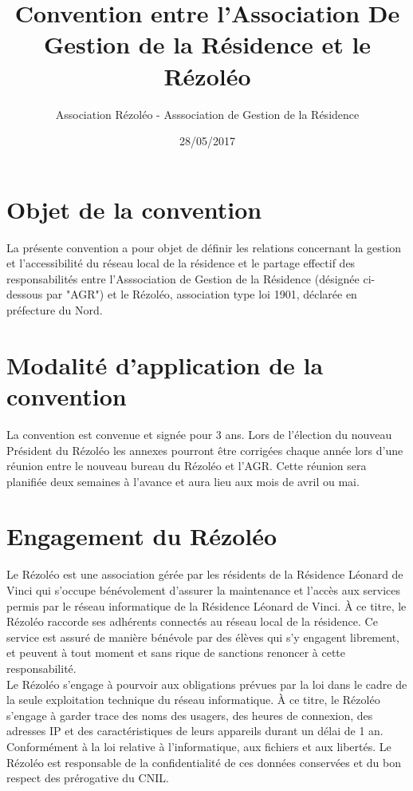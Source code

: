 \documentclass[12pt]{constitution}
\begin{document}
\title{Convention entre l'Association De Gestion de la Résidence et le Rézoléo}
\author{Association Rézoléo - Asssociation de Gestion de la Résidence}
\date{28/05/2017}
\maketitle

\section{Objet de la convention}

    La présente convention a pour objet de définir les relations concernant la gestion et l'accessibilité du réseau local de la résidence et le partage effectif des responsabilités entre l'Asssociation de Gestion de la Résidence (désignée ci-dessous par "AGR") et le Rézoléo, association type loi 1901, déclarée en préfecture du Nord.


\section{Modalité d'application de la convention}

    La convention est convenue et signée pour 3 ans. Lors de l'élection du nouveau Président du Rézoléo les annexes pourront être corrigées chaque année lors d'une réunion entre le nouveau bureau du Rézoléo et l'AGR. Cette réunion sera planifiée deux semaines à l'avance et aura lieu aux mois de avril ou mai.


\section{Engagement du Rézoléo}

    Le Rézoléo est une association gérée par les résidents de la Résidence Léonard de Vinci qui s'occupe bénévolement d'assurer la maintenance et l'accès aux services permis par le réseau informatique de la Résidence Léonard de Vinci. À ce titre, le Rézoléo raccorde ses adhérents connectés au réseau local de la résidence. Ce service est assuré de manière bénévole par des élèves qui s'y engagent librement, et peuvent à tout moment et sans rique de sanctions renoncer à cette responsabilité. \\


    Le Rézoléo s'engage à pourvoir aux obligations prévues par la loi dans le cadre de la seule exploitation technique du réseau informatique. À ce titre, le Rézoléo s'engage à garder trace des noms des usagers, des heures de connexion, des adresses IP et des caractéristiques de leurs appareils durant un délai de 1 an. Conformément à la loi relative à l'informatique, aux fichiers et aux libertés. Le Rézoléo est responsable de la confidentialité de ces données conservées et du bon respect des prérogative du CNIL.\\
\end{document}
